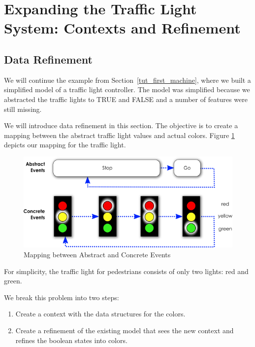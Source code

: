 \section{Expanding the Traffic Light System: Contexts and Refinement}
\label{tut_expanding_traffic_light_system}


\subsection{Data Refinement}
\label{tut_data_refinement}

We will continue the example from Section~\ref{tut_first_machine}, where we built a simplified model of a traffic light controller.  The model was simplified because we abstracted the traffic lights to TRUE and FALSE and a number of features were still missing.

We will introduce data refinement in this section.  The objective is to create a mapping between the abstract traffic light values and actual colors. Figure \ref{fig_tut_07_tl_colors} depicts our mapping for the traffic light.

\begin{figure}[!ht]
\begin{center}
	\includegraphics{img/tutorial/tl-colors.png}
	\caption{Mapping between Abstract and Concrete Events}
	\label{fig_tut_07_tl_colors}
\end{center}
\end{figure}

For simplicity, the traffic light for pedestrians consists of only two lights: red and green.

We break this problem into two steps:

\begin{enumerate}
	\item Create a context with the data structures for the colors.
	\item Create a refinement of the existing model that sees the new context and refines the boolean states into colors.
\end{enumerate}

